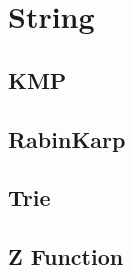 \section{String}
\subsection{KMP}
\raggedbottom
\hrulefill
\subsection{RabinKarp}
\raggedbottom
\hrulefill
\subsection{Trie}
\raggedbottom
\hrulefill
\subsection{Z Function}
\raggedbottom
\hrulefill

